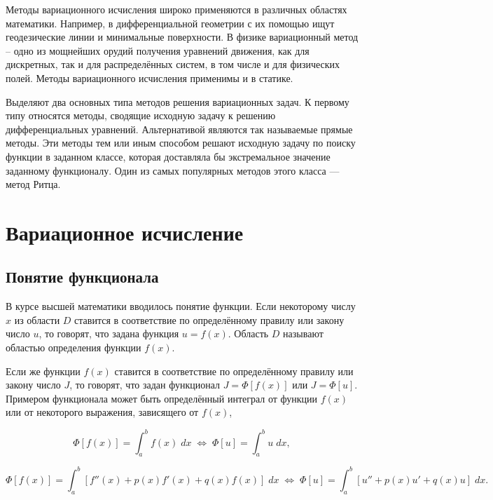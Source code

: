 Методы вариационного исчисления широко применяются в различных областях математики. Например, в дифференциальной геометрии с их помощью ищут геодезические линии и минимальные поверхности. В физике вариационный метод -- одно из мощнейших орудий получения уравнений движения, как для дискретных, так и для распределённых систем, в том числе и для физических полей. Методы вариационного исчисления применимы и в статике.

Выделяют два основных типа методов решения вариационных задач. К первому типу относятся методы, сводящие исходную задачу к решению дифференциальных уравнений. Альтернативой являются так называемые прямые методы. Эти методы тем или иным способом решают исходную задачу по поиску функции в заданном классе, которая доставляла бы экстремальное значение заданному функционалу. Один из самых популярных методов этого класса — метод Ритца.


\newpage

\section{Вариационное исчисление}

\subsection{Понятие функционала}

В курсе высшей математики вводилось понятие функции. Если некоторому числу $x$ из области $D$ ставится в соответствие по определённому правилу или закону число $u$, то говорят, 
что задана функция $u=f(x)$. Область $D$ называют областью определения функции $f(x)$.

Если же функции $f(x)$ ставится в соответствие по определённому правилу или закону число $J$, то говорят, что задан функционал $J = \Phi[f(x)]$ или 
$J = \Phi[u]$. Примером функционала может быть определённый интеграл от функции $f(x)$ или от некоторого выражения, зависящего от $f(x)$,

\begin{displaymath}
	\Phi[f(x)] = \int_{a}^{b} f(x) \; dx \; \Leftrightarrow \; \Phi[u] = \int_{a}^{b} u \; dx,
\end{displaymath}

\begin{displaymath}
	\Phi[f(x)] = \int_{a}^{b} [f''(x) + p(x)f'(x) + q(x)f(x)] \;  dx \; \Leftrightarrow \; \Phi[u] = \int_{a}^{b} [u'' + p(x)u' + q(x)u] \;  dx. 
\end{displaymath}

